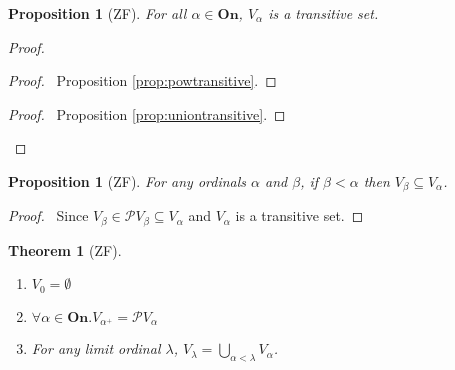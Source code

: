 \documentclass{book}
\let\qed\relax
\newtheorem{prop}[ax]{Proposition}
\newtheorem{thm}[ax]{Theorem}
\theoremstyle{definition}
\begin{document}
\begin{prop}[ZF]
For all $\alpha \in \mathbf{On}$, $V_\alpha$ is a transitive set.
\end{prop}

\begin{proof}
\pf
{}
\begin{proof}
	\pf\ Proposition \ref{prop:powtransitive}.
\end{proof}
\begin{proof}
	\pf\ Proposition \ref{prop:uniontransitive}.
\end{proof}
\qed
\end{proof}

\begin{prop}[ZF]
\label{prop:Vmono}
For any ordinals $\alpha$ and $\beta$, if $\beta < \alpha$ then $V_\beta \subseteq V_\alpha$.
\end{prop}

\begin{proof}
\pf\ Since $V_\beta \in \mathcal{P} V_\beta \subseteq V_\alpha$ and $V_\alpha$ is a transitive set. \qed
\end{proof}

\begin{thm}[ZF]$ $
\begin{enumerate}
\item $V_0 = \emptyset$
\item $\forall \alpha \in \mathbf{On}. V_{\alpha^+} = \mathcal{P} V_\alpha$
\item For any limit ordinal $\lambda$, $V_\lambda = \bigcup_{\alpha < \lambda} V_\alpha$.
\end{enumerate}
\end{thm}
\end{document}
